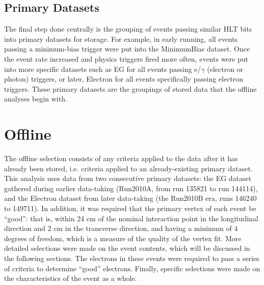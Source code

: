 \subsection{Primary Datasets}
The final step done centrally is the grouping of events passing similar 
HLT bits into primary datasets for storage.  
For example, in early running, all events passing a minimum-bias trigger 
were put into the MinimumBias dataset.  
Once the event rate increased and physics triggers fired more often, 
events were put into more specific datasets such as 
EG for all events passing e/$\gamma$ (electron or photon) triggers, 
or later, Electron for all events specifically passing 
electron triggers.  
These primary datasets are the groupings of stored data 
that the offline analyses begin with.  

\clearpage
\section{Offline}
The offline selection consists of any criteria applied to the data 
after it has already been stored, 
i.e. criteria applied to an already-existing primary dataset.  
This analysis uses data from two consecutive primary datasets: 
the EG dataset gathered during earlier data-taking 
(Run2010A, from run 135821 to run 144114), 
and the Electron dataset from later data-taking 
(the Run2010B era, runs 146240 to 149711).  
In addition, it was required that the primary vertex of 
each event be ``good'': 
that is, within 24 cm of the nominal interaction point 
in the longitudinal direction
and 2 cm in the transverse direction, 
and having a minimum of 4 degrees of freedom,
which is a measure of the quality of the vertex fit.  %
More detailed selections were made on the event contents, 
which will be discussed in the following sections.  
The electrons in these events were required to pass 
a series of criteria to determine ``good'' electrons.  
Finally, specific selections were made on the 
characteristics of the event as a whole.  

